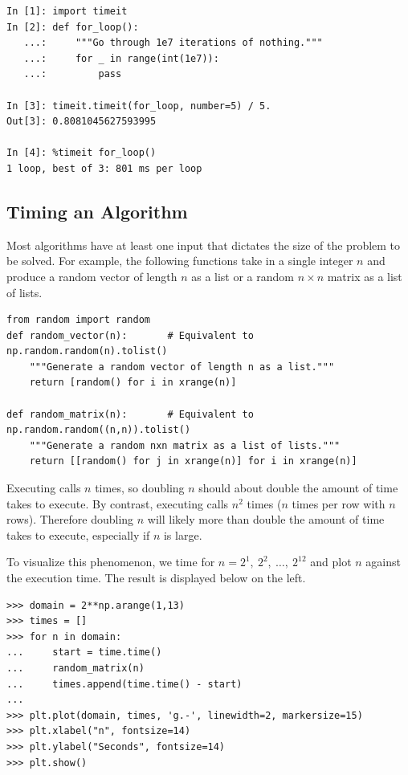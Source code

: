 \begin{lstlisting}
In [1]: import timeit
In [2]: def for_loop():
   ...:     """Go through 1e7 iterations of nothing."""
   ...:     for _ in range(int(1e7)):
   ...:         pass

In [3]: timeit.timeit(for_loop, number=5) / 5.
Out[3]: 0.8081045627593995

In [4]: %timeit for_loop()
1 loop, best of 3: 801 ms per loop
\end{lstlisting}

\newpage

\subsection*{Timing an Algorithm} %

Most algorithms have at least one input that dictates the size of the problem to be solved.
For example, the following functions take in a single integer $n$ and produce a random vector of length $n$ as a list or a random $n\times n$ matrix as a list of lists.

\begin{lstlisting}
from random import random
def random_vector(n):       # Equivalent to np.random.random(n).tolist()
    """Generate a random vector of length n as a list."""
    return [random() for i in xrange(n)]

def random_matrix(n):       # Equivalent to np.random.random((n,n)).tolist()
    """Generate a random nxn matrix as a list of lists."""
    return [[random() for j in xrange(n)] for i in xrange(n)]
\end{lstlisting}

Executing  calls  $n$ times, so doubling $n$ should about double the amount of time  takes to execute.
By contrast, executing  calls  $n^2$ times ($n$ times per row with $n$ rows).
Therefore doubling $n$ will likely more than double the amount of time  takes to execute, especially if $n$ is large.

To visualize this phenomenon, we time  for $n = 2^1,\ 2^2,\ \ldots,\ 2^{12}$ and plot $n$ against the execution time.
The result is displayed below on the left.%

\begin{lstlisting}
>>> domain = 2**np.arange(1,13)
>>> times = []
>>> for n in domain:
...     start = time.time()
...     random_matrix(n)
...     times.append(time.time() - start)
...
>>> plt.plot(domain, times, 'g.-', linewidth=2, markersize=15)
>>> plt.xlabel("n", fontsize=14)
>>> plt.ylabel("Seconds", fontsize=14)
>>> plt.show()
\end{lstlisting}

